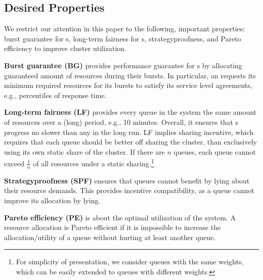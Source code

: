 \subsection{Desired Properties}
\label{sec:desire}


We restrict our attention in this paper to the following, important properties: burst guarantee for {\burstq}s, long-term fairness for {\batchq}s, strategyproofness, and Pareto efficiency to improve cluster utilization.

\textbf{Burst guarantee (BG)} provides performance guarantee for {\burstq}s by allocating guaranteed amount of resources during their bursts. 
In particular, an {\burstq} requests its minimum required resources for its bursts to satisfy its service level agreements, e.g., percentiles of response time. 


\textbf{Long-term fairness (LF)} provides every queue in the system the same amount of resources over a (long) period, e.g., 10 minutes.
Overall, it ensures that {\batchq}s progress no slower than any {\burstq} in the long run. LF implies sharing incentive, which requires that each queue should be better off sharing the cluster, than exclusively using its own static share of the cluster. 
If there are $n$ queues, each queue cannot exceed $\frac{1}{n}$ of all resources under a static sharing.\footnote{For simplicity of presentation, we consider queues with the same weights, which can be easily extended to queues with different weights.}

\textbf{Strategyproofness (SPF)} ensures that queues cannot benefit by lying about their resource demands. 
This provides incentive compatibility, as a queue cannot improve its allocation by lying. 

\textbf{Pareto efficiency (PE)} is about the optimal utilization of the system. 
A resource allocation is Pareto efficient if it is impossible to increase the allocation/utility of a queue without hurting at least another queue. %
